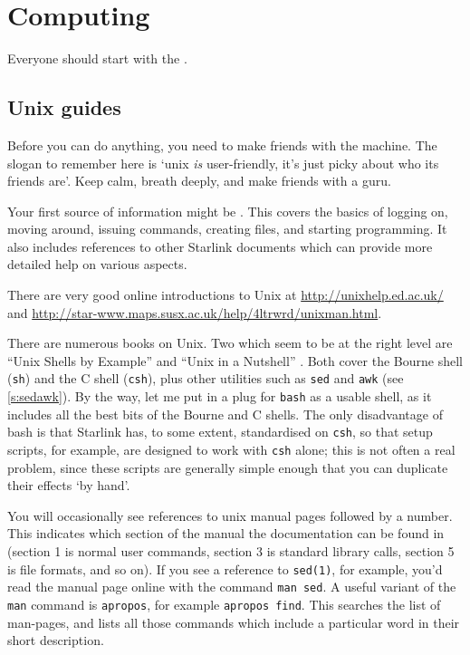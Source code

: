 \documentclass[11pt,oneside,chapters]{starlink}
\begin{document}
\chapter{Computing}
\label{s:computing}

Everyone should start with the
.

\section{Unix guides}
\label{s:unix}

Before you can do anything, you need to make friends with
the machine.  The slogan to remember here is `unix
\emph{is} user-friendly, it's just picky about who its
friends are'.  Keep calm, breath deeply, and make friends
with a guru.

Your first source of information might be
.
This covers the basics of logging on, moving
around, issuing commands, creating files, and starting
programming.  It also includes references to other Starlink
documents which can provide more detailed help on various
aspects.

There are very good online introductions to Unix at
\url{http://unixhelp.ed.ac.uk/}
and
\url{http://star-www.maps.susx.ac.uk/help/4ltrwrd/unixman.html}.

There are numerous books on Unix.  Two which seem to be at
the right level are
``Unix Shells by Example'' \citep{quigley}
and
``Unix in a Nutshell'' \citep{nutshell}.
Both cover
the Bourne shell (\texttt{sh}) and the C shell
(\texttt{csh}), plus other utilities such as
\texttt{sed} and \texttt{awk} (see \ref{s:sedawk}).
By the way, let me put in a plug for
\texttt{bash} as a usable shell, as it includes all the
best bits of the Bourne and C shells.  The only disadvantage
of bash is that Starlink has, to some extent, standardised
on \texttt{csh}, so that setup scripts, for example, are
designed to work with \texttt{csh} alone; this is not
often a real problem, since these scripts are generally
simple enough that you can duplicate their effects `by
hand'.

You will occasionally see references to unix manual pages
followed by a number.  This indicates which section of the
manual the documentation can be found in (section 1 is
normal user commands, section 3 is standard library calls,
section 5 is file formats, and so on).  If you see a
reference to \texttt{sed(1)}, for example, you'd read
the manual page online with the command \texttt{man sed}.
A useful variant of the \texttt{man}
command is \texttt{apropos}, for example \texttt{apropos find}.
This searches the list of man-pages, and lists
all those commands which include a particular word in their
short description.
\end{document}
